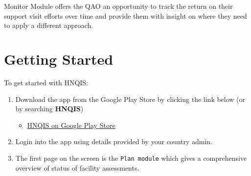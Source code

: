 \documentclass[]{book}
\providecommand{\tightlist}{%
  \setlength{\itemsep}{0pt}\setlength{\parskip}{0pt}}
\begin{document}
Monitor Module offers the QAO an opportunity to track the return on their support visit efforts over time and provide them with insight on where they need to apply a different approach.

\hypertarget{getting-started-1}{%
\section{Getting Started}\label{getting-started-1}}

To get started with HNQIS:

\begin{enumerate}
\def\labelenumi{\arabic{enumi}.}
\tightlist
\item
  Download the app from the Google Play Store by clicking the link below (or by searching \textbf{HNQIS})

  \begin{itemize}
  \tightlist
  \item
    \href{https://play.google.com/store/apps/details?id=org.eyeseetea.malariacare.hnqis_ng}{HNQIS on Google Play Store}
  \end{itemize}
\item
  Login into the app using details provided by your country admin.
\item
  The first page on the screen is the \texttt{Plan\ module} which gives a comprehensive overview of status of facility assessments.
\end{enumerate}
\end{document}
